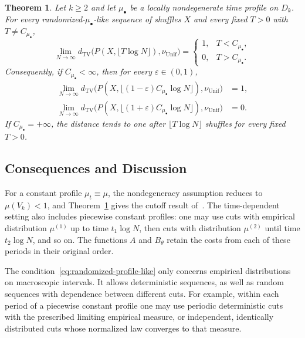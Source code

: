 \documentclass[11pt]{article}
\numberwithin{equation}{section}
\newtheorem{theorem}{Theorem}[section]
\theoremstyle{definition}
\theoremstyle{remark}
\newcommand{\TV}{\mathrm{TV}}
\newcommand{\Unif}{\mathrm{Unif}}
\newcommand{\dTV}{d_{\TV}}
\newcommand{\nuUnif}{\nu_{\Unif}}
\newcommand{\1}{\mathbf 1}
\begin{document}
\begin{theorem}\label{thm:main}
Let $k\ge2$ and let $\mu_\bullet$ be a locally nondegenerate time
profile on $D_k$. For every randomized-$\mu_\bullet$-like sequence
of shuffles $X$ and every fixed $T>0$ with $T\ne C_{\mu_\bullet}$,
\begin{equation}\label{eq:main-profile-limit}
 \lim_{N\to\infty}
 \dTV\bigl(P(X,\lfloor T\log N\rfloor),\nuUnif\bigr)
 =\begin{cases}
   1,&T<C_{\mu_\bullet},\\
   0,&T>C_{\mu_\bullet}.
  \end{cases}
\end{equation}
Consequently, if $C_{\mu_\bullet}<\infty$, then for every
$\varepsilon\in(0,1)$,
\begin{align}
 \lim_{N\to\infty}
 \dTV\bigl(P(X,\lfloor(1-\varepsilon)C_{\mu_\bullet}\log N\rfloor),
                  \nuUnif\bigr)&=1,\label{eq:main-cutoff-lower}\\
 \lim_{N\to\infty}
 \dTV\bigl(P(X,\lfloor(1+\varepsilon)C_{\mu_\bullet}\log N\rfloor),
                  \nuUnif\bigr)&=0.\label{eq:main-cutoff-upper}
\end{align}
If $C_{\mu_\bullet}=+\infty$, the distance tends to one after
$\lfloor T\log N\rfloor$ shuffles for every fixed $T>0$.
\end{theorem}

\subsection{Consequences and Discussion}

For a constant profile $\mu_t\equiv\mu$, the nondegeneracy assumption
reduces to $\mu(V_k)<1$, and Theorem~\ref{thm:main} gives the cutoff
result of~\cite{SSW}. The time-dependent setting also includes
piecewise constant profiles: one may use cuts with empirical
distribution $\mu^{(1)}$ up to time $t_1\log N$, then cuts with
distribution $\mu^{(2)}$ until time $t_2\log N$, and so on. The
functions $A$ and $B_\theta$ retain the costs from each of these
periods in their original order.

The condition~\eqref{eq:randomized-profile-like} only concerns empirical
distributions on macroscopic intervals. It allows deterministic sequences,
as well as random sequences with dependence between different cuts.
For example, within each period of a piecewise constant profile one may
use periodic deterministic cuts with the prescribed limiting empirical
measure, or independent, identically distributed cuts whose normalized
law converges to that measure.
\end{document}
